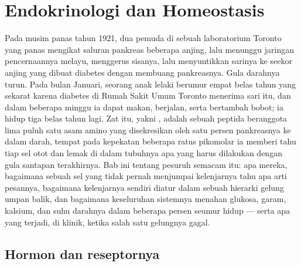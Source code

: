 \chapter{Endokrinologi dan Homeostasis}\label{ch:b3:endocrinology}

Pada musim panas tahun 1921, dua pemuda di sebuah laboratorium Toronto yang panas
mengikat saluran pankreas beberapa anjing, lalu menunggu jaringan
pencernaannya melayu, menggerus sisanya, lalu menyuntikkan sarinya ke seekor anjing
yang dibuat diabetes dengan membuang pankreasnya. Gula darahnya turun. Pada
bulan Januari, seorang anak lelaki berumur empat belas tahun yang sekarat karena diabetes di Rumah Sakit Umum
Toronto menerima sari itu, dan dalam beberapa minggu ia dapat makan,
berjalan, serta bertambah bobot; ia hidup tiga belas tahun lagi. Zat
itu, yakni , adalah sebuah peptida beranggota lima puluh satu asam amino yang disekresikan
oleh satu persen pankreasnya ke dalam darah, tempat pada kepekatan
beberapa ratus pikomolar ia memberi tahu tiap sel otot dan lemak di dalam tubuhnya
apa yang harus dilakukan dengan gula santapan terakhirnya. Bab ini tentang
pesuruh semacam itu: apa mereka, bagaimana sebuah sel yang tidak pernah menjumpai kelenjarnya
tahu apa arti pesannya, bagaimana kelenjarnya sendiri diatur
dalam sebuah hierarki gelung umpan balik, dan bagaimana keseluruhan sistemnya menahan
glukosa, garam, kalsium, dan suhu darahnya dalam beberapa persen
seumur hidup --- serta apa yang terjadi, di klinik, ketika salah satu
gelungnya gagal.

\section{Hormon dan reseptornya}

